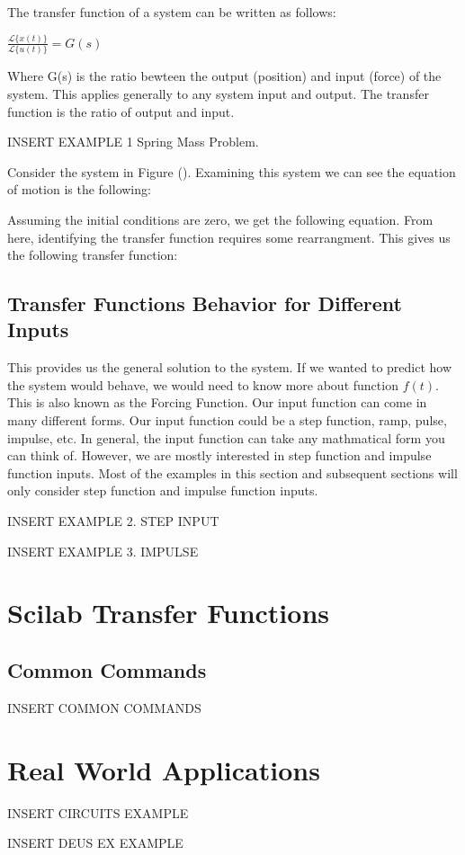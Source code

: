 \documentclass{tufte-book} %
\begin{document}
The transfer function of a system can be written as follows:

$ \frac{\mathscr{L}\{x(t)\}}{\mathscr{L}\{u(t)\}} = G(s) $

Where G(s) is the ratio bewteen the output (position) and input (force) of the system. This applies generally to any system input and output. The transfer function is the ratio of output and input. 

INSERT EXAMPLE 1 Spring Mass Problem. 

Consider the system in Figure (). Examining this system we can see the equation of motion is the following:

Assuming the initial conditions are zero, we get the following equation. From here, identifying the transfer function requires  some rearrangment. This gives us the following transfer function:





\subsection{Transfer Functions Behavior for Different Inputs}


This provides us the general solution to the system. If we wanted to predict how the system would behave, we would need to know more about function $ f(t) $. This is also known as the Forcing Function. Our input function can come in many different forms. Our input function could be a step function, ramp, pulse, impulse, etc. In general, the input function can take any mathmatical form you can think of. However, we are mostly interested in step function and impulse function inputs. Most of the examples in this section and subsequent sections will only consider step function and impulse function inputs. 

INSERT EXAMPLE 2. STEP INPUT

INSERT EXAMPLE 3. IMPULSE


\section{Scilab Transfer Functions}


\subsection{Common Commands}

INSERT COMMON COMMANDS

\section{Real World Applications}

INSERT CIRCUITS EXAMPLE

INSERT DEUS EX EXAMPLE
\end{document}
